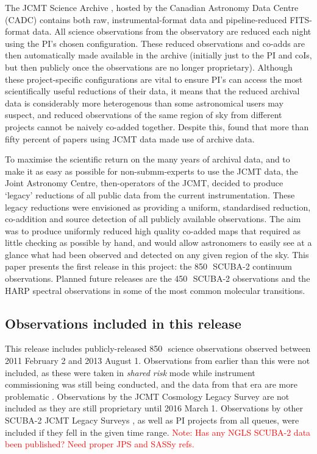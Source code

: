 \documentclass[usenatbib]{mn2e}
\newcommand{\um}{\micron}
\newcommand{\note}[1]{\textcolor{red}{Note: #1}}
\begin{document}
The JCMT Science Archive \citep{2015Economou}, hosted by the Canadian
Astronomy Data Centre (CADC) contains both raw, instrumental-format
data and pipeline-reduced FITS-format data. All science observations
from the observatory are reduced each night using the PI's chosen
configuration.  These reduced observations and co-adds are then
automatically made available in the archive (initially just to the PI
and coIs, but then publicly once the observations are no longer
proprietary). Although these project-specific configurations are vital
to ensure PI's can access the most scientifically useful reductions of
their data, it means that the reduced archival data is considerably
more heterogenous than some astronomical users may suspect, and
reduced observations of the same region of sky from different projects
cannot be naively co-added together. Despite this,
\citet{Bell2014} found that more than fifty percent of
papers using JCMT data made use of archive data.

To maximise the scientific return on the many years of archival data,
and to make it as easy as possible for non-submm-experts to use the
JCMT data, the Joint Astronomy Centre, then-operators of the JCMT,
decided to produce `legacy' reductions of all public data from the
current instrumentation. These legacy reductions were envisioned as
providing a uniform, standardised reduction, co-addition and source
detection of all publicly available observations. The aim was to
produce uniformly reduced high quality co-added maps that required as
little checking as possible by hand, and would allow astronomers to
easily see at a glance what had been observed and detected on any
given region of the sky. This paper presents the first release in this
project: the 850\,\um\ SCUBA-2 continuum observations. Planned future
releases are the 450\,\um\ SCUBA-2 observations and the HARP spectral
observations in some of the most common molecular transitions.



\subsection{Observations included in this release}

This release includes publicly-released 850\,\um\ science observations
observed between 2011 February 2 and 2013 August 1. Observations from
earlier than this were not included, as these were taken in
\emph{shared risk} mode while instrument commissioning was still being
conducted, and the data from that era are more problematic
\citep{SC19,Dempsey2010}.  Observations by the JCMT Cosmology Legacy
Survey \citep{Geach2013} are not included as they are still
proprietary until 2016 March 1. Observations by other SCUBA-2 JCMT Legacy
Surveys \citep[e.g.,][]{ChrysostomouJLS,GBS,SASSy,SONS,JPS}, as well as PI
projects from all queues, were included if they
fell in the given time range.
\note{Has any NGLS SCUBA-2 data been published? Need proper JPS and
  SASSy refs.}
\end{document}
